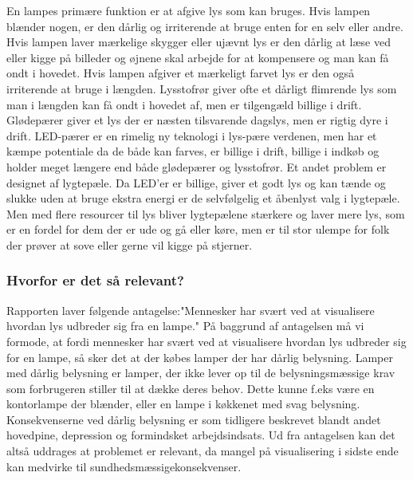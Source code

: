 En lampes primære funktion er at afgive lys som kan bruges. Hvis lampen blænder nogen, er den dårlig og irriterende at bruge enten for en selv eller andre. Hvis lampen laver mærkelige skygger eller ujævnt lys er den dårlig at læse ved eller kigge på billeder og øjnene skal arbejde for at kompensere og man kan få ondt i hovedet. Hvis lampen afgiver et mærkeligt farvet lys er den også irriterende at bruge i længden. Lysstofrør giver ofte et dårligt flimrende lys som man i længden kan få ondt i hovedet af, men er tilgengæld billige i drift. Glødepærer giver et lys der er næsten tilsvarende dagslys, men er rigtig dyre i drift\cite{videnskab_dk_led}. LED-pærer er en rimelig ny teknologi i lys-pære verdenen, men har et kæmpe potentiale da de både kan farves, er billige i drift, billige i indkøb og holder meget længere end både glødepærer og lysstofrør. Et andet problem er designet af lygtepæle. Da LED'er er billige, giver et godt lys og kan tænde og slukke uden at bruge ekstra energi er de selvfølgelig et åbenlyst valg i lygtepæle. Men med flere resourcer til lys bliver lygtepælene stærkere og laver mere lys, som er en fordel for dem der er ude og gå eller køre, men er til stor ulempe for folk der prøver at sove eller gerne vil kigge på stjerner\cite{dr_dk_lysforurening}.


\subsubsection{Hvorfor er det så relevant?}

Rapporten laver følgende antagelse:"Mennesker har svært ved at visualisere hvordan lys udbreder sig fra en lampe."
På baggrund af antagelsen må vi formode, at fordi mennesker har svært ved at visualisere hvordan lys udbreder sig for en lampe, så sker det at der købes lamper der har dårlig belysning. Lamper med dårlig belysning er lamper, der ikke lever op til de belysningsmæssige krav som forbrugeren stiller til at dække deres behov. Dette kunne f.eks være en kontorlampe der blænder, eller en lampe i køkkenet med svag belysning\cite{daarlig_belysning_konsekvenser}. Konsekvenserne ved dårlig belysning er som tidligere beskrevet blandt andet hovedpine, depression og formindsket arbejdsindsats. Ud fra antagelsen kan det altså uddrages at problemet er relevant, da mangel på visualisering i sidste ende kan medvirke til sundhedsmæssigekonsekvenser.